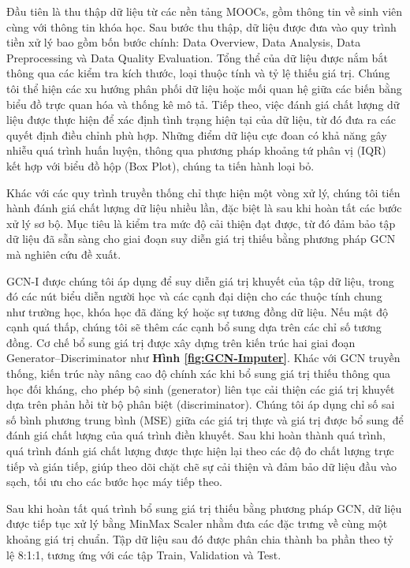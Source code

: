 Đầu tiên là thu thập dữ liệu từ các nền tảng MOOCs, gồm thông tin về sinh viên cùng với thông tin khóa học. Sau bước thu thập, dữ liệu được đưa vào quy trình tiền xử lý  bao gồm bốn bước chính: Data Overview, Data Analysis, Data Preprocessing và Data Quality Evaluation. Tổng thể của dữ liệu được nắm bắt thông qua các kiểm tra kích thước, loại thuộc tính và tỷ lệ thiếu giá trị. Chúng tôi thể hiện các xu hướng phân phối dữ liệu hoặc mối quan hệ giữa các biến bằng biểu đồ trực quan hóa và thống kê mô tả. Tiếp theo, việc đánh giá chất lượng dữ liệu được thực hiện để xác định tình trạng hiện tại của dữ liệu, từ đó đưa ra các quyết định điều chỉnh phù hợp. Những điểm dữ liệu cực đoan có khả năng gây nhiễu quá trình huấn luyện, thông qua phương pháp khoảng tứ phân vị (IQR) kết hợp với biểu đồ hộp (Box Plot), chúng ta tiến hành loại bỏ. 

Khác với các quy trình truyền thống chỉ thực hiện một vòng xử lý, chúng tôi tiến hành đánh giá chất lượng dữ liệu nhiều lần, đặc biệt là sau khi hoàn tất các bước xử lý sơ bộ. Mục tiêu là kiểm tra mức độ cải thiện đạt được, từ đó đảm bảo tập dữ liệu đã sẵn sàng cho giai đoạn suy diễn giá trị thiếu bằng phương pháp GCN mà nghiên cứu đề xuất.


GCN-I được chúng tôi áp dụng để suy diễn giá trị khuyết của tập dữ liệu, trong đó các nút biểu diễn người học và các cạnh đại diện cho các thuộc tính chung như trường học, khóa học đã đăng ký hoặc sự tương đồng dữ liệu. Nếu mật độ cạnh quá thấp, chúng tôi sẽ thêm các cạnh bổ sung dựa trên các chỉ số tương đồng. Cơ chế bổ sung giá trị được xây dựng trên kiến trúc hai giai đoạn Generator–Discriminator như \textbf{Hình \ref{fig:GCN-Imputer}}. Khác với GCN truyền thống, kiến trúc này nâng cao độ chính xác khi bổ sung giá trị thiếu thông qua học đối kháng, cho phép bộ sinh (generator) liên tục cải thiện các giá trị khuyết dựa trên phản hồi từ bộ phân biệt (discriminator). Chúng tôi áp dụng chỉ số sai số bình phương trung bình (MSE) giữa các giá trị thực và giá trị được bổ sung để đánh giá chất lượng của quá trình điền khuyết. Sau khi hoàn thành quá trình, quá trình đánh giá chất lượng được thực hiện lại theo các độ đo chất lượng trực tiếp và gián tiếp, giúp theo dõi chặt chẽ sự cải thiện và đảm bảo dữ liệu đầu vào sạch, tối ưu cho các bước học máy tiếp theo.

Sau khi hoàn tất quá trình bổ sung giá trị thiếu bằng phương pháp GCN, dữ liệu được tiếp tục xử lý bằng  MinMax Scaler nhằm đưa các đặc trưng về cùng một khoảng giá trị chuẩn. Tập dữ liệu sau đó được phân chia thành ba phần theo tỷ lệ 8:1:1, tương ứng với các tập Train, Validation và Test.

